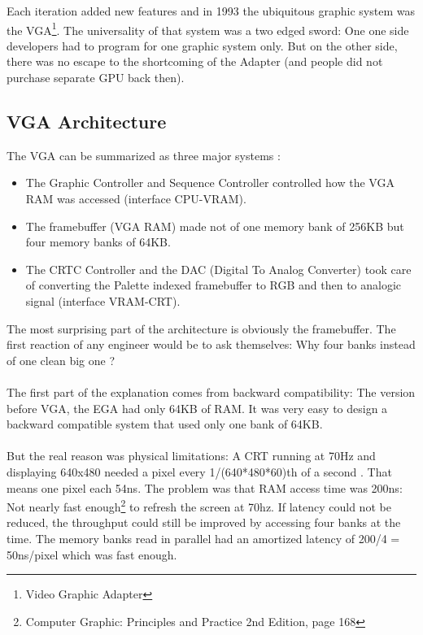 \documentclass[book.tex]{subfiles}
\begin{document}
Each iteration added new features and in 1993 the ubiquitous graphic system was the VGA\footnote{Video Graphic Adapter}. The universality of that system was a two edged sword: One one side developers had to program for one graphic system only. But on the other side, there was no escape to the shortcoming of the Adapter (and people did not purchase separate GPU back then).\\

\subsection{VGA Architecture}

The VGA can be summarized as three major systems :

\begin{itemize}
\item The Graphic Controller and Sequence Controller controlled how the VGA RAM was accessed (interface CPU-VRAM).
\item The framebuffer (VGA RAM) made not of one memory bank of 256KB but four memory banks of 64KB.
\item The CRTC Controller and the DAC (Digital To Analog Converter) took care of converting the Palette indexed framebuffer to RGB and then to analogic signal (interface VRAM-CRT).
\end{itemize}

The most surprising part of the architecture is obviously the framebuffer. The first reaction of any engineer would be to ask themselves: Why four banks instead of one clean big one ?\\
\\
The first part of the explanation comes from backward compatibility: The version before VGA, the EGA had only 64KB of RAM. It was very easy to design a backward compatible system that used only one bank of 64KB.\\
\\
But the real reason was physical limitations: A CRT running at 70Hz and displaying 640x480 needed a pixel every 1/(640*480*60)th of a second . That means one pixel each 54ns. The problem was that RAM access time was 200ns: Not nearly fast enough\footnote{Computer Graphic: Principles and Practice 2nd Edition, page 168} to refresh the screen at 70hz. If latency could not be reduced, the throughput could still be improved by accessing four banks at the time. The memory banks read in parallel had an amortized latency of 200/4 = 50ns/pixel which was fast enough.
\end{document}
